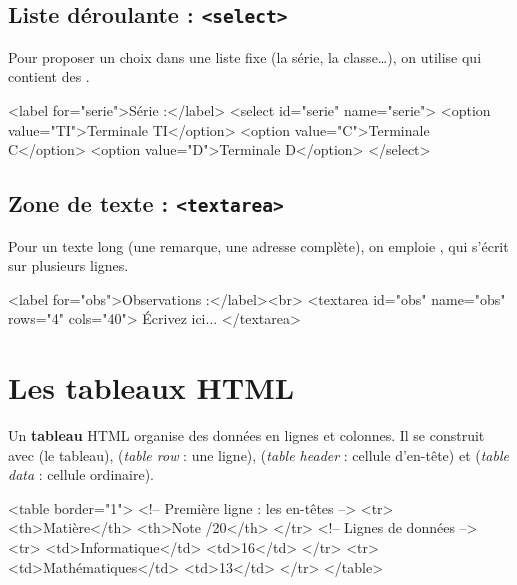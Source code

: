 \subsection{Liste déroulante : \texttt{<select>}}

Pour proposer un choix dans une liste fixe (la série, la classe\dots), on utilise
 qui contient des .

\begin{codehtml}
<label for="serie">Série :</label>
<select id="serie" name="serie">
  <option value="TI">Terminale TI</option>
  <option value="C">Terminale C</option>
  <option value="D">Terminale D</option>
</select>
\end{codehtml}


\subsection{Zone de texte : \texttt{<textarea>}}

Pour un texte long (une remarque, une adresse complète), on emploie
, qui s'écrit sur plusieurs lignes.

\begin{codehtml}
<label for="obs">Observations :</label><br>
<textarea id="obs" name="obs" rows="4" cols="40">
Écrivez ici...
</textarea>
\end{codehtml}

\section{Les tableaux HTML}

\begin{definition}
Un \textbf{tableau} HTML organise des données en lignes et colonnes. Il se construit
avec  (le tableau),  (\emph{table row} : une ligne),
 (\emph{table header} : cellule d'en-tête) et 
(\emph{table data} : cellule ordinaire).
\end{definition}

\begin{codehtml}
<table border="1">
  <!-- Première ligne : les en-têtes -->
  <tr>
    <th>Matière</th>
    <th>Note /20</th>
  </tr>
  <!-- Lignes de données -->
  <tr>
    <td>Informatique</td>
    <td>16</td>
  </tr>
  <tr>
    <td>Mathématiques</td>
    <td>13</td>
  </tr>
</table>
\end{codehtml}


